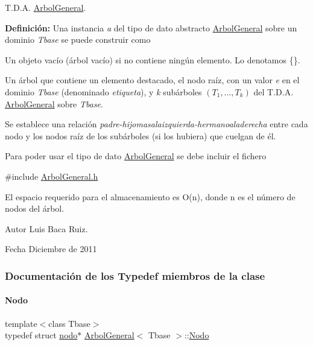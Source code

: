 T.\+D.\+A. \hyperlink{classArbolGeneral}{Arbol\+General}. 

{\bfseries Definición\+:} Una instancia {\itshape a} del tipo de dato abstracto \hyperlink{classArbolGeneral}{Arbol\+General} sobre un dominio {\itshape Tbase} se puede construir como


\begin{DoxyItemize}
\item Un objeto vacío (árbol vacío) si no contiene ningún elemento. Lo denotamos \{\}.
\item Un árbol que contiene un elemento destacado, el nodo raíz, con un valor {\itshape e} en el dominio {\itshape Tbase} (denominado {\itshape etiqueta}), y {\itshape k} subárboles $(T_1, \ldots, T_k)$ del T.\+D.\+A. \hyperlink{classArbolGeneral}{Arbol\+General} sobre {\itshape Tbase}.
\end{DoxyItemize}

Se establece una relación {\itshape padre-\/hijomasalaizquierda-\/hermanoaladerecha} entre cada nodo y los nodos raíz de los subárboles (si los hubiera) que cuelgan de él.

Para poder usar el tipo de dato \hyperlink{classArbolGeneral}{Arbol\+General} se debe incluir el fichero

{\ttfamily \#include \hyperlink{ArbolGeneral_8h}{Arbol\+General.\+h}}

El espacio requerido para el almacenamiento es O(n), donde n es el número de nodos del árbol.

\begin{DoxyAuthor}{Autor}
Luis Baca Ruiz. 
\end{DoxyAuthor}
\begin{DoxyDate}{Fecha}
Diciembre de 2011 
\end{DoxyDate}


\subsubsection{Documentación de los \textquotesingle{}Typedef\textquotesingle{} miembros de la clase}
\hypertarget{classArbolGeneral_a12cc1b74a9095d89bc7334290d332f7a}{}\label{classArbolGeneral_a12cc1b74a9095d89bc7334290d332f7a} 
\paragraph{\texorpdfstring{Nodo}{Nodo}}
{\footnotesize\ttfamily template$<$class Tbase$>$ \\
typedef struct \hyperlink{structArbolGeneral_1_1nodo}{nodo}$\ast$ \hyperlink{classArbolGeneral}{Arbol\+General}$<$ Tbase $>$\+::\hyperlink{classArbolGeneral_a12cc1b74a9095d89bc7334290d332f7a}{Nodo}}



